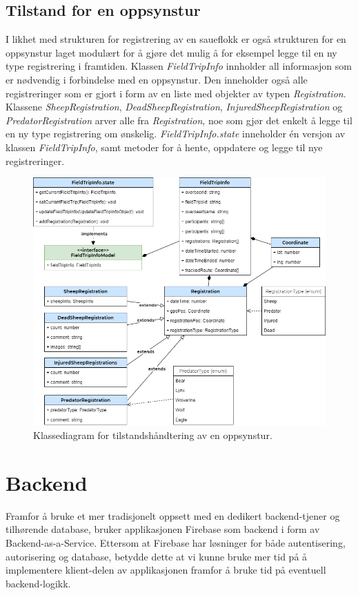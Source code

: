 \subsection{Tilstand for en oppsynstur}
I likhet med strukturen for registrering av en saueflokk er også strukturen for en oppsynstur laget modulært for å gjøre det mulig å for eksempel legge til en ny type registrering i framtiden. Klassen \textit{FieldTripInfo} innholder all informasjon som er nødvendig i forbindelse med en oppsynstur. Den inneholder også alle registreringer som er gjort i form av en liste med objekter av typen \textit{Registration}. Klassene \textit{SheepRegistration}, \textit{DeadSheepRegistration}, \textit{InjuredSheepRegistration} og \textit{PredatorRegistration} arver alle fra \textit{Registration}, noe som gjør det enkelt å legge til en ny type registrering om ønskelig. \textit{FieldTripInfo.state} inneholder én versjon av klassen \textit{FieldTripInfo}, samt metoder for å hente, oppdatere og legge til nye registreringer.
\begin{figure}[H]
\centering
\captionsetup{width=.8\linewidth}
\includegraphics[scale=0.6]{Figurer/diagram/tilstand_oppsynstur.png}
\caption{Klassediagram for tilstandshåndtering av en oppsynstur.}
\label{fig:tilstand_oppsynstur}
\end{figure}


\section{Backend}
Framfor å bruke et mer tradisjonelt oppsett med en dedikert backend-tjener og tilhørende database, bruker applikasjonen Firebase som backend i form av Backend-as-a-Service. Ettersom at Firebase har løsninger for både autentisering, autorisering og database, betydde dette at vi kunne bruke mer tid på å implementere klient-delen av applikasjonen framfor å bruke tid på eventuell backend-logikk.

